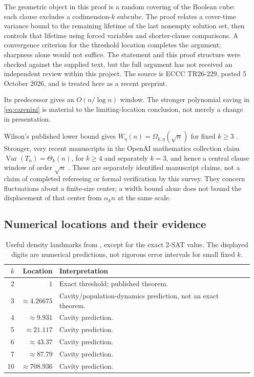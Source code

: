 The geometric object in this proof is a random covering of the Boolean cube:
each clause excludes a codimension-$k$ subcube. The proof relates a cover-time
variance bound to the remaining lifetime of the last nonempty solution set,
then controls that lifetime using forced variables and shorter-clause
comparisons. A convergence criterion for the threshold location completes
the argument; sharpness alone would not suffice. The statement and this proof
structure were checked against the supplied text, but the full argument has
not received an independent review within this project. The source is ECCC
TR26-229, posted 5 October 2026, and is treated here as a recent preprint.

Its predecessor \citep{careniniWindow} gives an $O(n/\log n)$ window.
The stronger polynomial saving in \eqref{eq:carenini} is material to the
limiting-location conclusion, not merely a change in presentation.

Wilson's published lower bound gives $W_\eta(n)=\Omega_{k,\eta}(\sqrt n)$
for fixed $k\ge3$ \citep[Corollary 4]{wilson2002}. Stronger, very recent
manuscripts in the OpenAI mathematics collection claim
$\operatorname{Var}(T_n)=\Theta_k(n)$, for $k\ge4$ and separately $k=3$,
and hence a central clause window of order $\sqrt n$
\citep[Theorem 1.1 in each]{oaVariance,oaVariance3}.
These are separately identified manuscript claims, not a claim of completed
refereeing or formal verification by this survey. They concern fluctuations
about a finite-size center; a width bound alone does not bound the displacement
of that center from $\alpha_k n$ at the same scale.

\subsection{Numerical locations and their evidence}
\begin{table}[htbp]
\centering\small
\begin{tabularx}{\linewidth}{@{}r r Y@{}}
\toprule
$k$ & Location & Interpretation \\
 & $1$ & Exact threshold; published theorem. \\
3 & $\approx4.26675$ & Cavity/population-dynamics prediction, not an exact theorem. \\
4 & $\approx9.931$ & Cavity prediction. \\
5 & $\approx21.117$ & Cavity prediction. \\
6 & $\approx43.37$ & Cavity prediction. \\
7 & $\approx87.79$ & Cavity prediction. \\
10 & $\approx708.936$ & Cavity prediction. \\
\bottomrule
\end{tabularx}
\caption{Useful density landmarks from \citet[Table 1 and Eq.~(43)]{mmz2006},
except for the exact $2$-SAT value. The displayed digits are numerical
predictions, not rigorous error intervals for small fixed $k$.}
\label{tab:locations}
\end{table}

